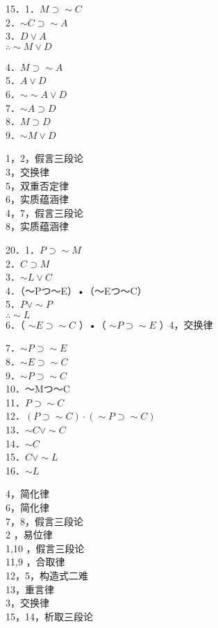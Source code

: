 15．1．$M \supset \sim C$\\
2．$\sim C \supset \sim A$\\
3．$D \vee A$\\
$\therefore \sim M \vee D$

4．$M \supset \sim A$\\
5．$A \vee D$\\
6．$\sim \sim A \vee D$\\
7．$\sim A \supset D$\\
8．$M \supset D$\\
9．$\sim M \vee D$

1，2，假言三段论\\
3，交换律\\
5，双重否定律\\
6，实质蕴涵律\\
4，7，假言三段论\\
8，实质蕴涵律

20．1．$P \supset \sim M$\\
2．$C \supset M$\\
3．$\sim L \vee C$\\
4．（～Pつ～E）•（～Eつ～C）\\
5．$P \vee \sim P$\\
$\therefore \sim L$\\
6．（ $\sim E \supset \sim C$ ）•（ $\sim P \supset \sim E$ ）4，交换律

7．$\sim P \supset \sim E$\\
8．$\sim E \supset \sim C$\\
9．$\sim P \supset \sim C$\\
10．～Mつ～C\\
11．$P \supset \sim C$\\
12．$(P \supset \sim C) \cdot(\sim P \supset \sim C)$\\
13．$\sim C \vee \sim C$\\
14．$\sim C$\\
15．$C \vee \sim L$\\
16．$\sim L$

4，简化律\\
6，简化律\\
7，8，假言三段论\\
2 ，易位律\\
1,10 ，假言三段论\\
11,9 ，合取律\\
12，5，构造式二难\\
13，重言律\\
3，交换律\\
15，14，析取三段论

